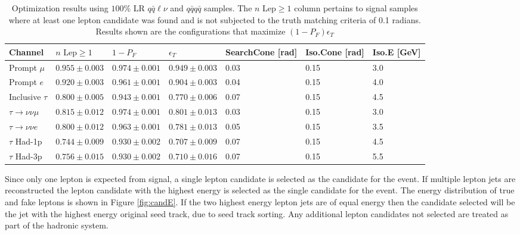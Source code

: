\begin{table}
\label{tab:taufinderopt}
\begin{tabular}{|p{}|p{}p{}p{}p{}p{}p{}|}

\hline 
Channel & $n \, \, \text{Lep} \geq 1$ & $1-P_{F}$ & $\epsilon_T$ & SearchCone [rad] & Iso.Cone [rad] & Iso.E [GeV] \\ 
\hline 
Prompt $\mu$ & $0.955 \pm 0.003$ & $0.974 \pm 0.001$ & $0.949 \pm 0.003$ & 0.03 & 0.15 & 3.0 \\ 

Prompt $e$ & $0.920 \pm 0.003$ & $0.961 \pm 0.001$ & $0.904 \pm 0.003$ & 0.04 & 0.15 & 4.0 \\ 

Inclusive $\tau$ & $0.800 \pm 0.005$ & $0.943 \pm 0.001$ &  $0.770 \pm 0.006$ & 0.07 & 0.15 & 4.5 \\ 


 \hline
$\tau \rightarrow \nu \nu \mu$ & $0.815 \pm 0.012$ & $0.974 \pm 0.001$ & $0.801 \pm 0.013$ & 0.03 & 0.15 & 3.0 \\ 
 
$\tau \rightarrow \nu \nu e$ &  $0.800 \pm 0.012$ & $0.963 \pm 0.001$ &  $0.781 \pm 0.013$ & 0.05 & 0.15 & 3.5 \\ 
 
$\tau$ Had-1p & $0.744 \pm 0.009$ & $0.930 \pm 0.002$ & $0.707 \pm 0.009$ & 0.07 & 0.15 & 4.5 \\ 
 
$\tau$ Had-3p &  $0.756 \pm 0.015$ & $0.930 \pm 0.002$ & $0.710 \pm 0.016$ & 0.07 & 0.15 & 5.5  \\
\hline
\end{tabular} 
\caption{Optimization results using $100 \%$ LR $q\bar{q}\ell \nu$ and $q\bar{q} q\bar{q}$ samples. The $n \, \, \text{Lep} \geq 1$ column pertains to signal samples where at least one lepton candidate was found and is not subjected to the truth matching criteria of 0.1 radians. Results shown are the configurations that maximize $(1-P_F)\epsilon_T$ }
\end{table}

Since only one lepton is expected from signal, a single lepton candidate is selected as the candidate for the event. If multiple lepton jets are reconstructed the lepton candidate with the highest energy is selected as the single candidate for the event. The energy distribution of true and fake leptons is shown in Figure \ref{fig:candE}. If the two highest energy lepton jets are of equal energy then the candidate selected will be the jet with the highest energy original seed track, due to seed track sorting.  Any additional lepton candidates not selected are treated as part of the hadronic system.


